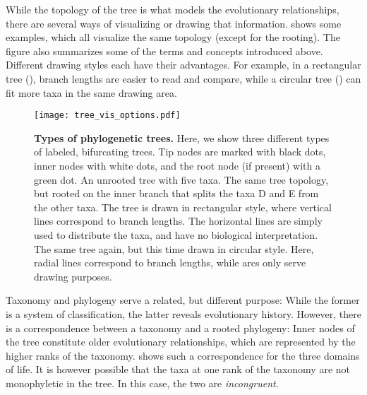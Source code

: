 While the topology of the tree is what models the evolutionary relationships,
there are several ways of visualizing or drawing that information.
 shows some examples, which all visualize the same topology (except for the rooting).
The figure also summarizes some of the terms and concepts introduced above.
Different drawing styles each have their advantages.
For example, in a rectangular tree (),
branch lengths are easier to read and compare,
while a circular tree () can fit more taxa in the same drawing area.

\begin{figure}[hpbt]
    \centering
    \texttt{[image: tree\_vis\_options.pdf]}
    \begin{subfigure}{0pt}
        \label{fig:tree_vis_options:sub:unrooted}
    \end{subfigure}
    \begin{subfigure}{0pt}
        \label{fig:tree_vis_options:sub:rectangular}
    \end{subfigure}
    \begin{subfigure}{0pt}
        \label{fig:tree_vis_options:sub:circular}
    \end{subfigure}
    \caption[Types of phylogenetic trees]{
        \textbf{Types of phylogenetic trees.}
        Here, we show three different types of labeled, bifurcating trees.
        Tip nodes are marked with black dots, inner nodes with white dots, and the root node (if present) with a green dot.
         An unrooted tree with five taxa.
         The same tree topology,
        but rooted on the inner branch that splits the taxa {\sffamily D} and {\sffamily E} from the other taxa.
        The tree is drawn in rectangular style,
        where vertical lines correspond to branch lengths.
        The horizontal lines are simply used to distribute the taxa, and have no biological interpretation.
         The same tree again, but this time drawn in circular style.
        Here, radial lines correspond to branch lengths, while arcs only serve drawing purposes.
    }
    \label{fig:tree_vis_options}
\end{figure}

Taxonomy and phylogeny serve a related, but different purpose:
While the former is a system of classification,
the latter reveals evolutionary history.
However, there is a correspondence between a taxonomy and a rooted phylogeny:
Inner nodes of the tree constitute older evolutionary relationships,
which are represented by the higher ranks of the taxonomy.
 shows such a correspondence for the three domains of life.
It is however possible that the taxa at one rank of the taxonomy are not monophyletic in the tree.
In this case, the two are \emph{incongruent}.


